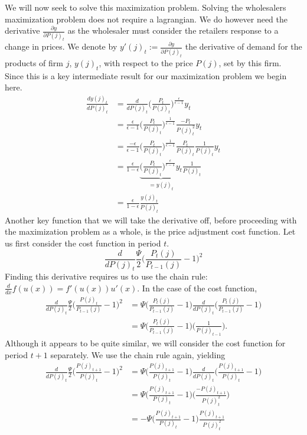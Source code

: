 \documentclass[11pt,a4paper,oneside]{book}
\begin{document}
We will now seek to solve this maximization problem.
Solving the wholesalers maximization problem does not require a lagrangian. We do however need the derivative $\frac{\partial y}{\partial P(j)_t}$ as the wholesaler must consider the retailers response to a change in prices.
We denote by $y'(j)_t:=\frac{\partial y}{\partial P(j)_t}$ the derivative of demand for the products of firm $j$, $y(j)_t$, with respect to the price $P(j)$, set by this firm.  Since this is a key intermediate result for our maximization problem we begin here.
\begin{align}
	\frac{dy(j)_t}{dP(j)_t}&=\frac{d}{dP(j)_t}\bigg(\frac{P_t}{P(j)_t}\bigg)^{\frac{\epsilon}{\epsilon-1}}y_t\nonumber\\\nonumber
	&= \frac{\epsilon}{\epsilon-1}\bigg(\frac{P_t}{P(j)_t}\bigg)^{\frac{1}{\epsilon-1}}\frac{-P_t}{P(j)_t^2}y_t\\\nonumber
	&= \frac{-\epsilon}{\epsilon-1}\bigg(\frac{P_t}{P(j)_t}\bigg)^{\frac{1}{\epsilon-1}}\frac{P_t}{P(j)_t}\frac{1}{P(j)_t}y_t\\\nonumber
	&= \frac{\epsilon}{1-\epsilon}\underbrace{\bigg(\frac{P_t}{P(j)_t}\bigg)^{\frac{\epsilon}{\epsilon-1}}y_t}_{=y(j)_t}\frac{1}{P(j)_t}\label{eq: y'} \\
	&=\frac{\epsilon}{1-\epsilon}\frac{y(j)_t}{P(j)_t}
\end{align}
Another key function that we will take the derivative off, before proceeding with the maximization problem as a whole, is the price adjustment cost function. Let us first consider the cost function in period $t$.
\begin{equation}
	\frac{d}{dP(j)_t}\frac{\Psi}{2}\bigg(\frac{P_t(j)}{P_{t-1}(j)}-1\bigg)^2
\end{equation}
Finding this derivative requires us to use the chain rule: $\frac{d}{dx}f(u(x))=f'(u(x))u'(x)$. In the case of the cost function, 
\begin{align}
	\nonumber\frac{d}{dP(j)_t}\frac{\Psi}{2}\bigg(\frac{P(j)_t}{P_{t-1}(j)}-1\bigg)^2 &= \Psi\bigg(\frac{P_t(j)}{P_{t-1}(j)}-1\bigg)\frac{d}{dP(j)_t}\bigg(\frac{P_t(j)}{P_{t-1}(j)}-1\bigg)\\
	&=\Psi\bigg(\frac{P_t(j)}{P_{t-1}(j)}-1\bigg)\bigg(\frac{1}{P(j)_{t-1}}\bigg).\label{eq: adjust_t}
\end{align}
Although it appears to be quite similar, we will consider the cost function for period $t+1$ separately. We use the chain rule again, yielding
\begin{align}
	\nonumber\frac{d}{dP(j)_t}\frac{\Psi}{2}\bigg(\frac{P(j)_{t+1}}{P(j)_{t}}-1\bigg)^2 &= \Psi\bigg(\frac{P(j)_{t+1}}{P(j)_{t}}-1\bigg)\frac{d}{dP(j)_t}\bigg(\frac{P(j)_{t+1}}{P(j)_{t}}-1\bigg)\\
	&=\Psi\bigg(\frac{P(j)_{t+1}}{P(j)_{t}}-1\bigg)\bigg(\frac{-P(j)_{t+1}}{P(j)_{t}^2}\bigg)\nonumber\\
	&=-\Psi\bigg(\frac{P(j)_{t+1}}{P(j)_{t}}-1\bigg)\frac{P(j)_{t+1}}{P(j)_{t}^2}\label{eq: adjust_t1}
\end{align}
\end{document}
